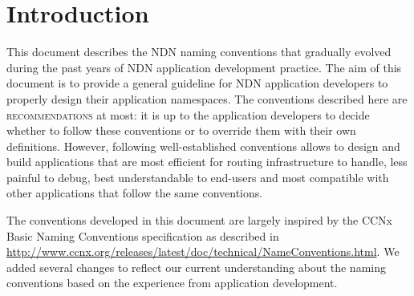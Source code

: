 \section{Introduction}

This document describes the NDN naming conventions that gradually evolved during the past years of NDN application development practice. The aim of this document is to provide a general guideline for NDN application developers to properly design their application namespaces. The conventions described here are \textsc{recommendations} at most: it is up to the application developers to decide whether to follow these conventions or to override them with their own definitions. However, following well-established conventions allows to design and build applications that are most efficient for routing infrastructure to handle, less painful to debug, best understandable to end-users and most compatible with other applications that follow the same conventions.

The conventions developed in this document are largely inspired by the CCNx Basic Naming Conventions specification as described in \url{http://www.ccnx.org/releases/latest/doc/technical/NameConventions.html}. We added several changes to reflect our current understanding about the naming conventions based on the experience from application development.



